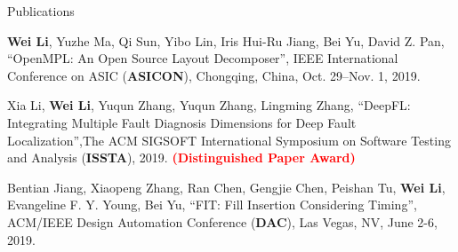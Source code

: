 \begin{rSection}{Publications}
\begin{description}[font=\normalfont]
{}
\item[{[C3]}]{
    \textbf{Wei Li}, Yuzhe Ma, Qi Sun, Yibo Lin, Iris Hui-Ru Jiang, Bei Yu, David Z. Pan,
    ``OpenMPL: An Open Source Layout Decomposer'', IEEE International Conference on ASIC (\textbf{ASICON}), Chongqing, China, Oct. 29–Nov. 1, 2019. 
}
\item[{[C2]}]{
    Xia Li, \textbf{Wei Li}, Yuqun Zhang, Yuqun Zhang, Lingming Zhang, 
    ``DeepFL: Integrating Multiple Fault Diagnosis Dimensions for Deep Fault Localization'',The ACM SIGSOFT International Symposium on Software Testing and Analysis 
      (\textbf{ISSTA}), 2019. \textcolor{red}{\textbf{(Distinguished Paper Award)}}
}
\item[{[C1]}]{
    Bentian Jiang, Xiaopeng Zhang, Ran Chen, Gengjie Chen, Peishan Tu, \textbf{Wei Li}, Evangeline F. Y. Young, Bei Yu, 
    ``FIT: Fill Insertion Considering Timing'', 
    ACM/IEEE Design Automation Conference (\textbf{DAC}), Las Vegas, NV, June 2-6, 2019.
}


\end{description}


\end{rSection}

